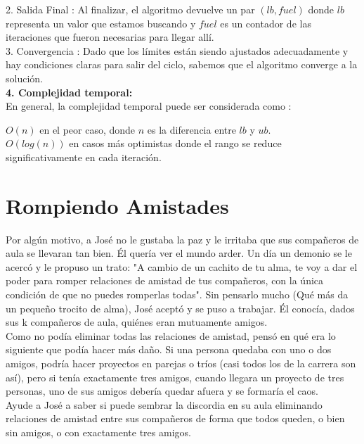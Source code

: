 \documentclass[
10pt, %
a4paper, %
oneside, %
headinclude,footinclude, %
BCOR5mm, %
]{scrartcl}
\begin{document}
2. Salida Final : Al finalizar, el algoritmo devuelve un par $(lb, fuel)$ donde $lb$ representa un valor que estamos buscando y $fuel$ es un contador de las iteraciones 
que fueron necesarias para llegar allí.\\

3. Convergencia : Dado que los límites están siendo ajustados adecuadamente y hay condiciones claras para salir del ciclo, sabemos que el algoritmo converge a la solución. \\

\textbf{4. Complejidad temporal:} \\ 

En general, la complejidad temporal puede ser considerada como : 

$O(n)$ en el peor caso, donde $n$ es la diferencia entre $lb$ y $ub$. \\

$O(log(n))$ en casos más optimistas donde el rango se reduce significativamente en cada iteración.

\section{Rompiendo Amistades}

Por algún motivo, a José no le gustaba la paz y le irritaba que sus compañeros de aula se llevaran tan bien. Él quería ver
el mundo arder. Un día un demonio se le acercó y le propuso un trato: "A cambio de un cachito de tu alma, te voy a dar el poder para
romper relaciones de amistad de tus compañeros, con la única condición de que no puedes romperlas todas". Sin pensarlo mucho (Qué más
da un pequeño trocito de alma), José aceptó y se puso a trabajar. Él conocía, dados sus k compañeros de aula, quiénes eran mutuamente
amigos.\\

Como no podía eliminar todas las relaciones de amistad, pensó en qué era lo siguiente que podía hacer más daño. Si una persona quedaba con
uno o dos amigos, podría hacer proyectos en parejas o tríos (casi todos los de la carrera son así), pero si tenía exactamente tres amigos,
cuando llegara un proyecto de tres personas, uno de sus amigos debería quedar afuera y se formaría el caos. \\

Ayude a José a saber si puede sembrar la discordia en su aula eliminando relaciones de amistad entre sus compañeros de forma que todos queden, o bien sin amigos, o con exactamente tres amigos.
\end{document}
